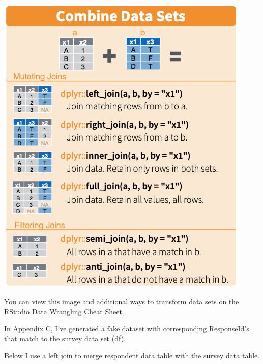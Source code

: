 \documentclass[]{book}
\newenvironment{Shaded}{\begin{snugshade}}{\end{snugshade}}
\newcommand{\CommentTok}[1]{\textcolor[rgb]{0.56,0.35,0.01}{\textit{#1}}}
\newcommand{\DataTypeTok}[1]{\textcolor[rgb]{0.13,0.29,0.53}{#1}}
\newcommand{\KeywordTok}[1]{\textcolor[rgb]{0.13,0.29,0.53}{\textbf{#1}}}
\newcommand{\NormalTok}[1]{#1}
\newcommand{\OperatorTok}[1]{\textcolor[rgb]{0.81,0.36,0.00}{\textbf{#1}}}
\newcommand{\StringTok}[1]{\textcolor[rgb]{0.31,0.60,0.02}{#1}}
\begin{document}
\includegraphics{figs/combine_datasets.png}

You can view this image and additional ways to transform data sets on the \href{https://www.rstudio.com/wp-content/uploads/2015/02/data-wrangling-cheatsheet.pdf}{RStudio Data Wrangling Cheat Sheet}.

In \protect\hyperlink{appendixC}{Appendix C}, I've generated a fake dataset with corresponding ResponseId's that match to the survey data set (df).

Below I use a left join to merge respondent data table with the survey data table.

\begin{Shaded}
\end{Shaded}
\end{document}
